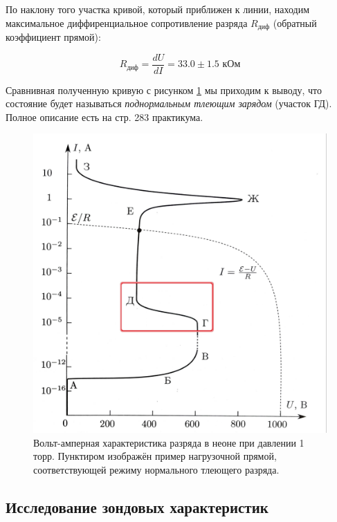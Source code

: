 По наклону того участка кривой, который приближен к линии, находим максимальное диффиренциальное сопротивление разряда $R_\text{диф}$ (обратный коэффициент прямой):

\begin{equation}
    R_\text{диф} = \dfrac{dU}{dI} = 33.0 \pm 1.5 \text{ кОм}
\end{equation}

Сравнивная полученную кривую с рисунком \ref{fig:vah-dis-all} мы приходим к выводу, что состояние будет называться \textit{поднормальным тлеющим зарядом} (участок ГД). Полное описание есть на стр. 283 практикума.

\begin{figure}[h]
    \centering
    \includegraphics[height=\imageheight]{images/vah_discharge_all.jpg}
    \caption{Вольт-амперная характеристика разряда в неоне при давлении 1 торр. Пунктиром изображён пример нагрузочной прямой, соответствующей режиму нормального тлеющего разряда.}
    \label{fig:vah-dis-all}
\end{figure}

\newpage
\subsection*{Исследование зондовых характеристик}

